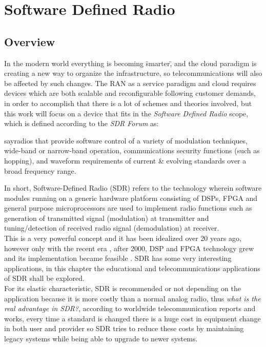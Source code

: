 \chapter{Software Defined Radio}
\label{chap:sdr}

\section{Overview}%
\label{sdr:overview}

In the modern world everything is becoming \"smarter\", and the cloud paradigm is
creating a new way to organize the infrastructure, so telecommunications will
also be affected by such changes. The RAN as a service  paradigm and cloud
requires devices which are both scalable and reconfigurable following customer
demands, in order to accomplish that there is a lot of schemes and theories
involved, but this work will focus on a device that fits in the \emph{Software
Defined Radio} scope, which is defined according to the \emph{SDR Forum}
\cite{web:sdrforum} as:

say{radios that provide software control of a variety of modulation techniques,
wide-band or narrow-band operation, communications security functions (such as
hopping), and waveform requirements of current \& evolving standards over a
broad frequency range.}

In short, Software-Defined Radio (SDR) refers to the technology wherein software
modules running on a generic hardware platform consisting of DSPs, FPGA and
general purpose microprocessors are used to implement radio functions such as
generation of transmitted signal (modulation) at transmitter and
tuning/detection of received radio signal (demodulation) at receiver.\\

This is a very powerful concept and it has been idealized over 20 years ago,
however only with the recent era , after 2000, DSP and FPGA technology grew and
its implementation became feasible \cite{ladimer2009}. SDR has some very
interesting applications, in this chapter the educational and telecommunications
applications of SDR shall be explored.\\

For its elastic characteristic, SDR is recommended or not depending on the
application because it is more costly than a normal analog radio, thus
\emph{what is the real advantage in SDR?}, according to worldwide
telecommunication reports and works, every time a standard is changed there is a
huge cost in equipment change in both user and provider so SDR tries to reduce
these costs by maintaining legacy systems while being able to upgrade to newer
systems\cite{dayananda2012}.\\

